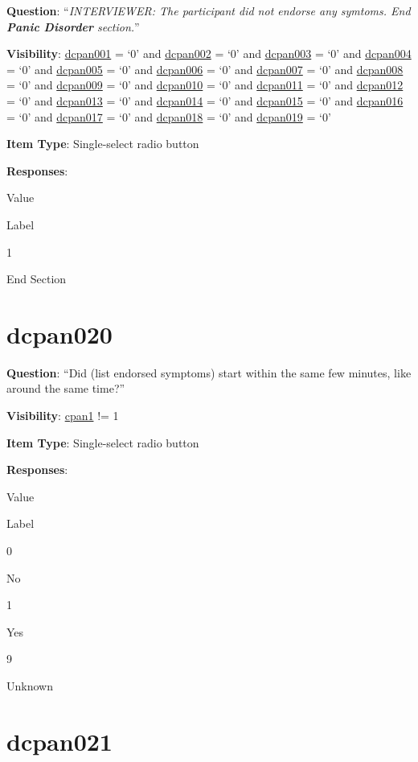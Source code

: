 \documentclass[]{book}
\begin{document}
\textbf{Question}: ``\emph{INTERVIEWER: The participant did not endorse any symtoms. End \textbf{Panic Disorder} section.}''

\textbf{Visibility}: \protect\hyperlink{dcpan001}{dcpan001} = `0' and \protect\hyperlink{dcpan002}{dcpan002} = `0' and \protect\hyperlink{dcpan003}{dcpan003} = `0' and \protect\hyperlink{dcpan004}{dcpan004} = `0' and \protect\hyperlink{dcpan005}{dcpan005} = `0' and \protect\hyperlink{dcpan006}{dcpan006} = `0' and \protect\hyperlink{dcpan007}{dcpan007} = `0' and \protect\hyperlink{dcpan008}{dcpan008} = `0' and \protect\hyperlink{dcpan009}{dcpan009} = `0' and \protect\hyperlink{dcpan010}{dcpan010} = `0' and \protect\hyperlink{dcpan011}{dcpan011} = `0' and \protect\hyperlink{dcpan012}{dcpan012} = `0' and \protect\hyperlink{dcpan013}{dcpan013} = `0' and \protect\hyperlink{dcpan014}{dcpan014} = `0' and \protect\hyperlink{dcpan015}{dcpan015} = `0' and \protect\hyperlink{dcpan016}{dcpan016} = `0' and \protect\hyperlink{dcpan017}{dcpan017} = `0' and \protect\hyperlink{dcpan018}{dcpan018} = `0' and \protect\hyperlink{dcpan019}{dcpan019} = `0'

\textbf{Item Type}: Single-select radio button

\textbf{Responses}:

Value

Label

1

End Section

\hypertarget{dcpan020}{%
\section{dcpan020}\label{dcpan020}}

\textbf{Question}: ``Did (list endorsed symptoms) start within the same few minutes, like around the same time?''

\textbf{Visibility}: \protect\hyperlink{cpan1}{cpan1} != 1

\textbf{Item Type}: Single-select radio button

\textbf{Responses}:

Value

Label

0

No

1

Yes

9

Unknown

\hypertarget{dcpan021}{%
\section{dcpan021}\label{dcpan021}}
\end{document}
